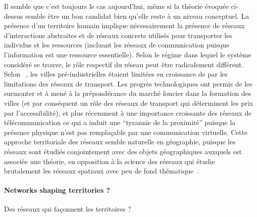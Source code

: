 { Il semble que c'est toujours le cas aujourd'hui, même si la théorie évoquée ci-dessus semble être un bon candidat bien qu'elle reste à un niveau conceptuel. La présence d'un territoire humain implique nécessairement la présence de réseaux d'interactions abstraites et de réseaux concrets utilisés pour transporter les individus et les ressources (incluant les réseaux de communication puisque l'information est une ressource essentielle). Selon le régime dans lequel le système considéré se trouve, le rôle respectif du réseau peut être radicalement différent. Selon ~\cite{duranton1999distance}, les villes pré-industrielles étaient limitées en croissance de par les limitations des réseaux de transport. Les progrès technologiques ont permis de les surmonter  
et à mené à la prépondérance du marché foncier dans la formation des villes (et par conséquent un rôle des réseaux de transport qui déterminent les prix par l'accessibilité), et plus récemment à une importance croissante des réseaux de télécommunication ce qui a induit une ``tyrannie de la proximité'' puisque la présence physique n'est pas remplaçable par une communication virtuelle. Cette approche territoriale des réseaux semble naturelle en géographie, puisque les réseaux sont étudiés conjointement avec des objets géographiques auxquels est associée une théorie, en opposition à la science des réseaux qui étudie brutalement les réseaux spatiaux avec peu de fond thématique~\cite{ducruet2014spatial}.  
}

\paragraph{Networks shaping territories ?}{Des réseaux qui façonnent les territoires ?}



